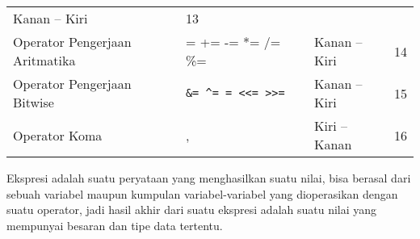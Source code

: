 \begin{longtable}[]{@{}llll@{}}
\begin{minipage}[t]{0.14\columnwidth}
Kanan -- Kiri
\strut\end{minipage} &
\begin{minipage}[t]{0.05\columnwidth}\raggedright\strut
13
\strut\end{minipage}\tabularnewline
\begin{minipage}[t]{0.52\columnwidth}\raggedright\strut
Operator Pengerjaan Aritmatika
\strut\end{minipage} &
\begin{minipage}[t]{0.17\columnwidth}\raggedright\strut
= += -= *= /= \%=
\strut\end{minipage} &
\begin{minipage}[t]{0.14\columnwidth}\raggedright\strut
Kanan -- Kiri
\strut\end{minipage} &
\begin{minipage}[t]{0.05\columnwidth}\raggedright\strut
14
\strut\end{minipage}\tabularnewline
\begin{minipage}[t]{0.52\columnwidth}\raggedright\strut
Operator Pengerjaan Bitwise
\strut\end{minipage} &
\begin{minipage}[t]{0.17\columnwidth}\raggedright\strut
\texttt{\&=\ \^{}=\ \textbar{}=\ \textless{}\textless{}=\ \textgreater{}\textgreater{}=}
\strut\end{minipage} &
\begin{minipage}[t]{0.14\columnwidth}\raggedright\strut
Kanan -- Kiri
\strut\end{minipage} &
\begin{minipage}[t]{0.05\columnwidth}\raggedright\strut
15
\strut\end{minipage}\tabularnewline
\begin{minipage}[t]{0.52\columnwidth}\raggedright\strut
Operator Koma
\strut\end{minipage} &
\begin{minipage}[t]{0.17\columnwidth}\raggedright\strut
,
\strut\end{minipage} &
\begin{minipage}[t]{0.14\columnwidth}\raggedright\strut
Kiri -- Kanan
\strut\end{minipage} &
\begin{minipage}[t]{0.05\columnwidth}\raggedright\strut
16
\strut\end{minipage}\tabularnewline
\bottomrule
\end{longtable}

Ekspresi adalah suatu peryataan yang menghasilkan suatu nilai, bisa
berasal dari sebuah variabel maupun kumpulan variabel-variabel yang
dioperasikan dengan suatu operator, jadi hasil akhir dari suatu ekspresi
adalah suatu nilai yang mempunyai besaran dan tipe data tertentu.

